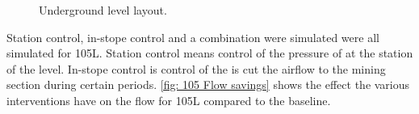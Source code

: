 	\begin{figure}[h!]
		\centering
		\caption{Underground level layout.}
		\label{fig: KUS Simulation level layout}
	\end{figure}	
	\clearpage
	Station control, in-stope control and a combination were simulated were all simulated for 105L. Station control means control of the pressure of at the station of the level. In-stope control is control of the is cut the airflow to the mining section during certain periods. \cref{fig: 105 Flow savings} shows the effect the various interventions have on  the flow for 105L compared to the baseline.

